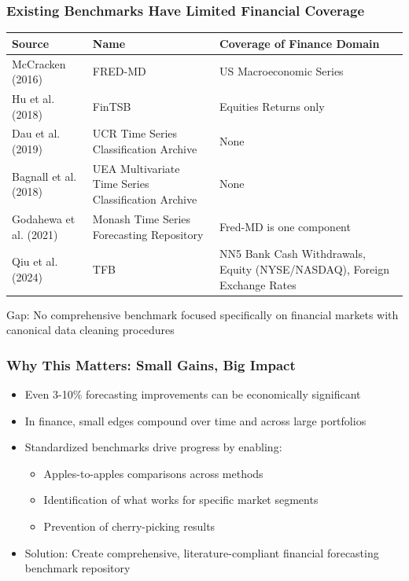 \documentclass[ignorenonframetext, 9pt]{beamer}
\begin{document}
\begin{frame}
\frametitle{Existing Benchmarks Have Limited Financial Coverage}
\tiny
\begin{table}
\centering
\begin{tabular}{llp{4cm}}
\toprule
Source & Name & Coverage of Finance Domain \\
\midrule
McCracken (2016) & FRED-MD & US Macroeconomic Series \\
Hu et al. (2018) & FinTSB & Equities Returns only \\
Dau et al. (2019) & UCR Time Series Classification Archive & None \\
Bagnall et al. (2018) & UEA Multivariate Time Series Classification Archive & None \\
Godahewa et al. (2021) & Monash Time Series Forecasting Repository & Fred-MD is one component \\
Qiu et al. (2024) & TFB & NN5 Bank Cash Withdrawals, Equity (NYSE/NASDAQ), Foreign Exchange Rates \\
\bottomrule
\end{tabular}
\end{table}
\vspace{0.3cm}
\alert{Gap:} No comprehensive benchmark focused specifically on financial markets with canonical data cleaning procedures
\end{frame}

\begin{frame}
\frametitle{Why This Matters: Small Gains, Big Impact}
\begin{itemize}
\item Even 3-10\% forecasting improvements can be economically significant
\vspace{0.3cm}
\item In finance, small edges compound over time and across large portfolios
\vspace{0.3cm}
\item Standardized benchmarks drive progress by enabling:
\begin{itemize}
\item Apples-to-apples comparisons across methods
\item Identification of what works for specific market segments
\item Prevention of cherry-picking results
\end{itemize}
\vspace{0.3cm}
\item \alert{Solution}: Create comprehensive, literature-compliant financial forecasting benchmark repository
\end{itemize}
\end{frame}
\end{document}
